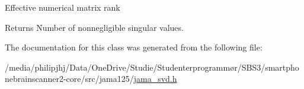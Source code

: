 Effective numerical matrix rank \begin{DoxyReturn}{Returns}
Number of nonnegligible singular values. 
\end{DoxyReturn}


The documentation for this class was generated from the following file\-:\begin{DoxyCompactItemize}
\item 
/media/philipjhj/\-Data/\-One\-Drive/\-Studie/\-Studenterprogrammør/\-S\-B\-S3/smartphonebrainscanner2-\/core/src/jama125/\hyperlink{jama__svd_8h}{jama\-\_\-svd.\-h}\end{DoxyCompactItemize}
